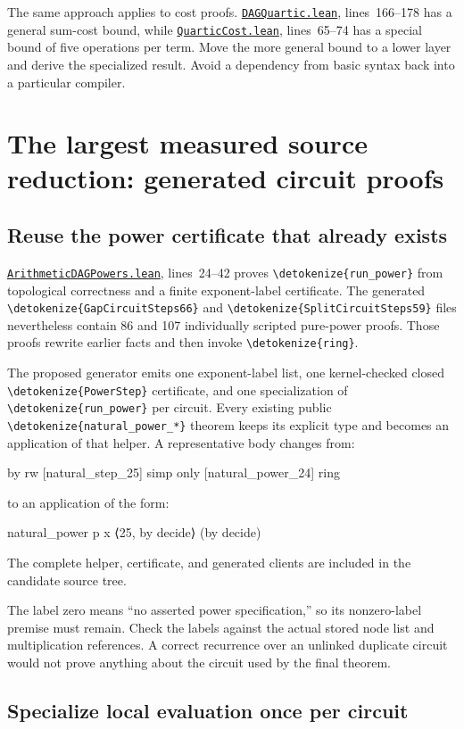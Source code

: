 \documentclass[11pt,letterpaper]{article}
\newcommand{\code}[1]{\expandafter\nolinkurl\expandafter{\detokenize{#1}}}
\newcommand{\repo}{https://github.com/VladimirReshetnikov/ProveIt/blob/60e9c5d620c6c387d932876cfa2d9376f64ea56c}
\newcommand{\src}[2]{\href{\repo/Computability/DiophantineConsistency/Lean/DiophantineConsistency/#1.lean}{\nolinkurl{#1.lean}}, lines~#2}
\begin{document}
The same approach applies to cost proofs. \src{DAGQuartic}{166--178} has a general sum-cost bound, while \src{QuarticCost}{65--74} has a special bound of five operations per term. Move the more general bound to a lower layer and derive the specialized result. Avoid a dependency from basic syntax back into a particular compiler.

\section{The largest measured source reduction: generated circuit proofs}

\subsection{Reuse the power certificate that already exists}

\src{ArithmeticDAGPowers}{24--42} proves \code{run_power} from topological correctness and a finite exponent-label certificate. The generated \code{GapCircuitSteps66} and \code{SplitCircuitSteps59} files nevertheless contain 86 and 107 individually scripted pure-power proofs. Those proofs rewrite earlier facts and then invoke \code{ring}.

The proposed generator emits one exponent-label list, one kernel-checked closed \code{PowerStep} certificate, and one specialization of \code{run_power} per circuit. Every existing public \code{natural_power_*} theorem keeps its explicit type and becomes an application of that helper. A representative body changes from:
\begin{Lean}
by
  rw [natural_step_25]
  simp only [natural_power_24]
  ring
\end{Lean}
to an application of the form:
\begin{Lean}
natural_power p x ⟨25, by decide⟩ (by decide)
\end{Lean}
The complete helper, certificate, and generated clients are included in the candidate source tree.

The label zero means ``no asserted power specification,'' so its nonzero-label premise must remain. Check the labels against the actual stored node list and multiplication references. A correct recurrence over an unlinked duplicate circuit would not prove anything about the circuit used by the final theorem.

\subsection{Specialize local evaluation once per circuit}
\end{document}
